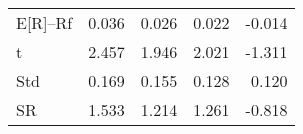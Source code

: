 \begin{tabular}{lrrrr}
\toprule
\midrule
E[R]--Rf & 0.036 & 0.026 & 0.022 & -0.014 \\
t & 2.457 & 1.946 & 2.021 & -1.311 \\
Std & 0.169 & 0.155 & 0.128 & 0.120 \\
SR & 1.533 & 1.214 & 1.261 & -0.818 \\
\bottomrule
\end{tabular}
